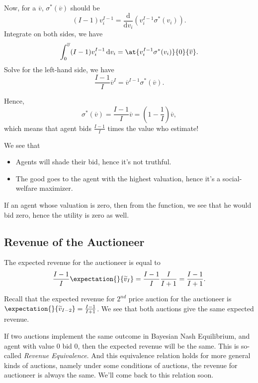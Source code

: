 \par Now, for a \(\overline{v}\), \(\sigma^{*}(\overline{v})\) should be
\[
	(I - 1)v_{i}^{I-1} = \frac{\mathrm{d}}{\mathrm{d}v_{i}} \left(v_{i}^{I-1}\sigma^{*}(v_{i})\right).
\]
Integrate on both sides, we have
\[
	\int_0^{\overline{v}}(I - 1)v_{i}^{I-1}\,\mathrm{d} v_{i} = \at{v_{i}^{I-1}\sigma^{*}(v_{i})}{0}{\overline{v}}.
\]
Solve for the left-hand side, we have
\[
	\frac{I - 1}{I}\overline{v}^I = \overline{v}^{I-1}\sigma^{*}(\overline{v}).
\]

Hence,
\[
	\sigma^{*}(\overline{v}) = \frac{I-1}{I}\overline{v} = (1 - \frac{1}{I})\overline{v},
\]
which means that agent bids \(\frac{I - 1}{I}\) times the value who estimate!

\begin{note}
	We see that
	\begin{itemize}
		\item Agents will shade their bid, hence it's not truthful.
		\item The good goes to the agent with the highest valuation, hence it's a social-welfare maximizer.
	\end{itemize}
\end{note}

\begin{remark}
	If an agent whose valuation is zero, then from the function, we see that he would bid zero, hence the utility is zero as well.
\end{remark}

\subsection{Revenue of the Auctioneer}
The expected revenue for the auctioneer is equal to
\[
	\frac{I - 1}{I}\expectation{}{\widetilde{v}_I} = \frac{I - 1}{I}\frac{I}{I+1} = \frac{I - 1}{I+1}.
\]

\begin{remark}
	Recall that the expected revenue for \(2^{nd}\) price auction for the auctioneer is \(\expectation{}{\widetilde{v}_{I-2}} = \frac{I-1}{I+1}\).
	We see that both auctions give the same expected revenue.
\end{remark}

\begin{note}
	If two auctions implement the same outcome in Bayesian Nash Equilibrium, and agent with value \(0\) bid \(0\), then the expected
	revenue will be the same. This is so-called \emph{Revenue Equivalence}. And this equivalence relation holds for more general kinds of
	auctions, namely under some conditions of auctions, the revenue for auctioneer is always the same. We'll come back to this
	relation soon.
\end{note}

